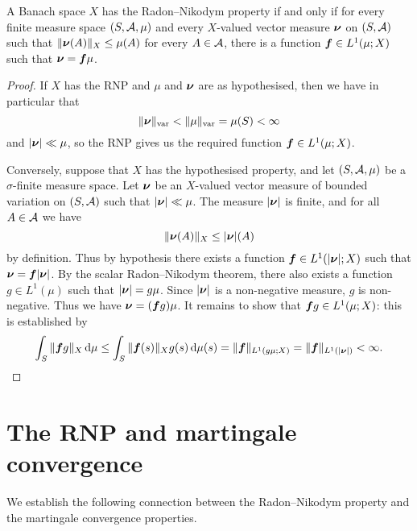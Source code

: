 \begin{prop}\label{prop:RNP-finite-sufficient}
  A Banach space $X$ has the Radon--Nikodym property if and only if for every finite measure space $(S,\mathcal{A},\mu)$ and every $X$-valued vector measure $\bm{\nu}$ on $(S,\mathcal{A})$ such that $\|\bm{\nu}(A)\|_{X} \leq \mu(A)$ for every $A \in \mathcal{A}$, there is a function $\bm{f} \in L^1(\mu;X)$ such that $\bm{\nu} = \bm{f}\mu$.
\end{prop}

\begin{proof}
  If $X$ has the RNP and $\mu$ and $\bm{\nu}$ are as hypothesised, then we have in particular that
  \begin{equation*}
    \|\bm{\nu}\|_{\mathrm{var}} < \|\mu\|_{\mathrm{var}} = \mu(S) < \infty
  \end{equation*}
  and $|\bm{\nu}| \ll \mu$, so the RNP gives us the required function $\bm{f} \in L^1(\mu;X)$.

  Conversely, suppose that $X$ has the hypothesised property, and let $(S,\mathcal{A},\mu)$ be a $\sigma$-finite measure space.
  Let $\bm{\nu}$ be an $X$-valued vector measure of bounded variation on $(S,\mathcal{A})$ such that $|\bm{\nu}| \ll \mu$.
  The measure $|\bm{\nu}|$ is finite, and for all $A \in \mathcal{A}$ we have
  \begin{equation*}
    \|\bm{\nu}(A)\|_{X} \leq |\bm{\nu}|(A)
  \end{equation*}
  by definition.
  Thus by hypothesis there exists a function $\bm{f} \in L^1(|\bm{\nu}|;X)$ such that $\bm{\nu} = \bm{f}|\bm{\nu}|$.
  By the scalar Radon--Nikodym theorem, there also exists a function $g \in L^1(\mu)$ such that $|\bm{\nu}| = g\mu$.
  Since $|\bm{\nu}|$ is a non-negative measure, $g$ is non-negative.
  Thus we have $\bm{\nu} = (\bm{f}g)\mu$.
  It remains to show that $\bm{f}g \in L^1(\mu;X)$: this is established by
  \begin{equation*}
    \int_{S} \|\bm{f}g\|_{X} \, \mathrm{d}\mu
    \leq \int_{S} \|\bm{f}(s)\|_{X} g(s) \, \mathrm{d}\mu(s) = \|\bm{f}\|_{L^1(g\mu;X)} = \|\bm{f}\|_{L^1(|\bm{\nu}|)} < \infty. 
  \end{equation*}
\end{proof}

\section{The RNP and martingale convergence}

We establish the following connection between the Radon--Nikodym property and the martingale convergence properties.

